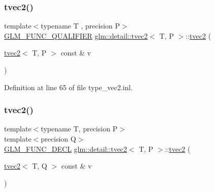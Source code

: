 \subsubsection{\texorpdfstring{tvec2()}{tvec2()}\hspace{0.1cm}{\footnotesize\ttfamily [2/15]}}
{\footnotesize\ttfamily template$<$typename T , precision P$>$ \\
\hyperlink{setup_8hpp_a33fdea6f91c5f834105f7415e2a64407}{G\+L\+M\+\_\+\+F\+U\+N\+C\+\_\+\+Q\+U\+A\+L\+I\+F\+I\+ER} \hyperlink{structglm_1_1detail_1_1tvec2}{glm\+::detail\+::tvec2}$<$ T, P $>$\+::\hyperlink{structglm_1_1detail_1_1tvec2}{tvec2} (\begin{DoxyParamCaption}\item[{\hyperlink{structglm_1_1detail_1_1tvec2}{tvec2}$<$ T, P $>$ const \&}]{v }\end{DoxyParamCaption})}



Definition at line 65 of file type\+\_\+vec2.\+inl.

\mbox{\label{structglm_1_1detail_1_1tvec2_a6a255de24aea35da27b4f41579b3d56f}} 
\subsubsection{\texorpdfstring{tvec2()}{tvec2()}\hspace{0.1cm}{\footnotesize\ttfamily [3/15]}}
{\footnotesize\ttfamily template$<$typename T, precision P$>$ \\
template$<$precision Q$>$ \\
\hyperlink{setup_8hpp_ab2d052de21a70539923e9bcbf6e83a51}{G\+L\+M\+\_\+\+F\+U\+N\+C\+\_\+\+D\+E\+CL} \hyperlink{structglm_1_1detail_1_1tvec2}{glm\+::detail\+::tvec2}$<$ T, P $>$\+::\hyperlink{structglm_1_1detail_1_1tvec2}{tvec2} (\begin{DoxyParamCaption}\item[{\hyperlink{structglm_1_1detail_1_1tvec2}{tvec2}$<$ T, Q $>$ const \&}]{v }\end{DoxyParamCaption})}

\mbox{\label{structglm_1_1detail_1_1tvec2_af5e5e83f86c18552e4e1045d74f676ad}} 
